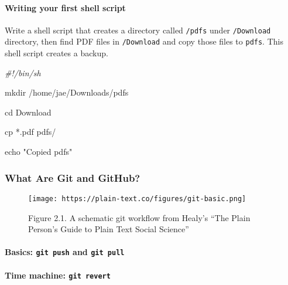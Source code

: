 \documentclass[
]{book}
\newenvironment{Shaded}{\begin{snugshade}}{\end{snugshade}}
\newcommand{\BuiltInTok}[1]{#1}
\newcommand{\CommentTok}[1]{\textcolor[rgb]{0.56,0.35,0.01}{\textit{#1}}}
\newcommand{\FunctionTok}[1]{\textcolor[rgb]{0.00,0.00,0.00}{#1}}
\newcommand{\NormalTok}[1]{#1}
\newcommand{\StringTok}[1]{\textcolor[rgb]{0.31,0.60,0.02}{#1}}
\begin{document}
\hypertarget{writing-your-first-shell-script}{%
\paragraph{Writing your first shell script}\label{writing-your-first-shell-script}}

Write a shell script that creates a directory called \texttt{/pdfs} under \texttt{/Download} directory, then find PDF files in \texttt{/Download} and copy those files to \texttt{pdfs}. This shell script creates a backup.

\begin{Shaded}
\begin{Highlighting}[]

\CommentTok{\#!/bin/sh}

\FunctionTok{mkdir}\NormalTok{ /home/jae/Downloads/pdfs }

\BuiltInTok{cd}\NormalTok{ Download}

\FunctionTok{cp}\NormalTok{ *.pdf pdfs/ }

\BuiltInTok{echo} \StringTok{"Copied pdfs"}
\end{Highlighting}
\end{Shaded}

\hypertarget{what-are-git-and-github}{%
\subsubsection{What Are Git and GitHub?}\label{what-are-git-and-github}}

\begin{figure}
\centering
\texttt{[image: https://plain-text.co/figures/git-basic.png]}
\caption{Figure 2.1. A schematic git workflow from Healy's ``The Plain Person's Guide to Plain Text Social Science''}
\end{figure}

\hypertarget{basics-git-push-and-git-pull}{%
\paragraph{\texorpdfstring{Basics: \texttt{git\ push} and \texttt{git\ pull}}{Basics: git push and git pull}}\label{basics-git-push-and-git-pull}}

\hypertarget{time-machine-git-revert}{%
\paragraph{\texorpdfstring{Time machine: \texttt{git\ revert}}{Time machine: git revert}}\label{time-machine-git-revert}}
\end{document}
